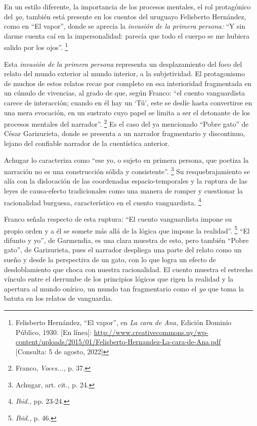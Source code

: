 \documentclass[14pt,twoside,final]{extbook} %
\let\oldfootnote\footnote
\renewcommand\footnote[1]{%
\oldfootnote{\hspace{1mm}#1}}
\begin{document}
En un estilo diferente, la importancia de los procesos mentales, el rol protagónico del \emph{yo}, también está presente en los cuentos del uruguayo Felisberto Hernández, como en ``El vapor'', donde se aprecia la \emph{invasión de la primera persona:} ``Y sin darme cuenta caí en la impersonalidad: parecía que todo el cuerpo se me hubiera salido por los ojos''.\footnote{Felisberto Hernández, ``El vapor'', en \emph{La cara de Ana,} Edición Dominio Público, 1930. [En línea]: \url{http://www.creativecommons.uy/wp-content/uploads/2015/01/Felisberto-Hernandez-La-cara-de-Ana.pdf} [Consulta: 5 de agosto, 2022]}

Esta \emph{invasión de la primera persona} representa un desplazamiento del foco del relato del mundo exterior al mundo interior, a la subjetividad. El protagonismo de muchos de estos relatos recae por completo en esa interioridad fragmentada en un cúmulo de vivencias, al grado de que, según Franco: ``el cuento vanguardista carece de interacción; cuando en él hay un `Tú', este se deslíe hasta convertirse en una mera evocación, en un sustrato cuyo papel se limita a ser el detonante de los procesos mentales del narrador''.\footnote{Franco, \emph{Voces...,} p. 37.} Es el caso del ya mencionado ``Pobre gato'' de César Garizurieta, donde se presenta a un narrador fragmentario y discontinuo, lejano del confiable narrador de la cuentística anterior.

Achugar lo caracteriza como ``ese yo, o sujeto en primera persona, que poetiza la narración no es una construcción sólida y consistente''.\footnote{Achugar, art. cit., p. 24.} Su resquebrajamiento se alía con la dislocación de las coordenadas espacio-temporales y la ruptura de las leyes de causa-efecto tradicionales como una manera de romper y cuestionar la racionalidad burguesa, característico en el cuento vanguardista.\footnote{\emph{Ibid.,} pp. 23-24.}

Franco señala respecto de esta ruptura: ``El cuento vanguardista impone su propio orden y a él se somete más allá de la lógica que impone la realidad''.\footnote{\emph{Ibid.,} p. 46.} ``El difunto y yo'', de Garmendia, es una clara muestra de esto, pero también ``Pobre gato'', de Garizurieta, pues el narrador despliega una parte del relato como un sueño y desde la perspectiva de un gato, con lo que logra un efecto de desdoblamiento que choca con nuestra racionalidad. El cuento muestra el estrecho vínculo entre el derrumbe de los principios lógicos que rigen la realidad y la apertura al mundo onírico, un mundo tan fragmentario como el \emph{yo} que toma la batuta en los relatos de vanguardia.
\end{document}
